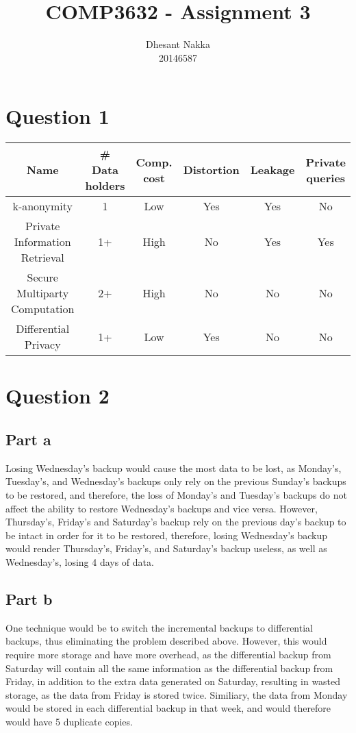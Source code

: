 \documentclass[12pt,a4paper]{article}
\title{COMP3632 - Assignment 3}
\author{Dhesant Nakka\\20146587}
\begin{document}
\maketitle

\section{Question 1}
\begin{tabulary}{\textwidth}{C|C|C|C|C|C}
  \hline
  \textbf{Name} & \textbf{\# Data holders} & \textbf{Comp. cost} & \textbf{Distortion} & \textbf{Leakage} & \textbf{Private queries} \\
  \hline
  k-anonymity & 1 & Low & Yes & Yes & No \\
  \hline
  Private Information Retrieval & 1+ & High & No & Yes & Yes \\
  \hline
  Secure Multiparty Computation & 2+ & High & No & No & No \\
  \hline
  Differential Privacy & 1+ & Low & Yes & No & No \\
  \hline
\end{tabulary}

\section{Question 2}
\subsection{Part a}
Losing Wednesday's backup would cause the most data to be lost, as Monday's, Tuesday's, and Wednesday's backups only rely on the previous Sunday's backups to be restored, and therefore, the loss of Monday's and Tuesday's backups do not affect the ability to restore Wednesday's backups and vice versa. However, Thursday's, Friday's and Saturday's backup rely on the previous day's backup to be intact in order for it to be restored, therefore, losing Wednesday's backup would render Thursday's, Friday's, and Saturday's backup useless, as well as Wednesday's, losing 4 days of data.

\subsection{Part b}
One technique would be to switch the incremental backups to differential backups, thus eliminating the problem described above. However, this would require more storage and have more overhead, as the differential backup from Saturday will contain all the same information as the differential backup from Friday, in addition to the extra data generated on Saturday, resulting in wasted storage, as the data from Friday is stored twice. Similiary, the data from Monday would be stored in each differential backup in that week, and would therefore would have 5 duplicate copies.
\end{document}
